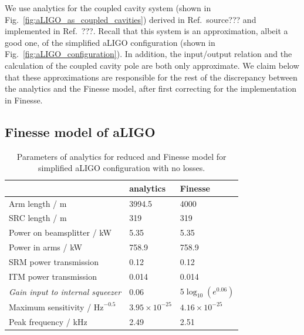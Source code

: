 \documentclass[aps,pra,superscriptaddress,reprint,nofootinbib]{revtex4-1}
\begin{document}
We use analytics for the coupled cavity system (shown in Fig.~\ref{fig:aLIGO_as_coupled_cavities}) derived in Ref.~{\Large source???} and implemented in Ref.~{\Large ???}. Recall that this system is an approximation, albeit a good one, of the simplified aLIGO configuration (shown in Fig.~\ref{fig:aLIGO_configuration}). In addition, the input/output relation and the calculation of the coupled cavity pole are both only approximate. We claim below that these approximations are responsible for the rest of the discrepancy between the analytics and the Finesse model, after first correcting for the implementation in Finesse.


\subsection{Finesse model of aLIGO}

\begin{table}[]
	\centering
	\begin{tabular}{l|ll}
	 & analytics & Finesse \\ \hline
	Arm length / m & 3994.5 & 4000 \\
	SRC length / m & 319 & 319 \\
	Power on beamsplitter / kW & 5.35 & 5.35 \\
	Power in arms / kW & 758.9 & 758.9 \\
	SRM power transmission & 0.12 & 0.12 \\
	ITM power transmission & 0.014 & 0.014 \\
	\textit{Gain input to internal squeezer} & 0.06 & $5 \log_{10}(e^{0.06})$ \\
	Maximum sensitivity / $\mathrm{Hz}^{-0.5}$ & $3.95 \times 10^{-25}$ & $4.16 \times 10^{-25}$ \\
	Peak frequency / kHz & 2.49 & 2.51
	\end{tabular}%
	\caption{Parameters of analytics for reduced and Finesse model for simplified aLIGO configuration with no losses.}
	\label{tab:aLIGO_parameters}
\end{table}
\end{document}
